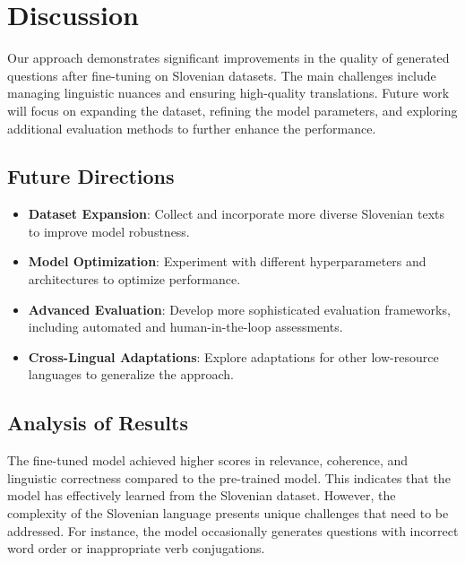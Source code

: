 \documentclass[fleqn,moreauthors,10pt]{ds_report}
\begin{document}



\section*{Discussion}
Our approach demonstrates significant improvements in the quality of generated questions after fine-tuning on Slovenian datasets. The main challenges include managing linguistic nuances and ensuring high-quality translations. Future work will focus on expanding the dataset, refining the model parameters, and exploring additional evaluation methods to further enhance the performance.

\subsection*{Future Directions}
\begin{itemize}[noitemsep]
    \item \textbf{Dataset Expansion}: Collect and incorporate more diverse Slovenian texts to improve model robustness.
    \item \textbf{Model Optimization}: Experiment with different hyperparameters and architectures to optimize performance.
    \item \textbf{Advanced Evaluation}: Develop more sophisticated evaluation frameworks, including automated and human-in-the-loop assessments.
    \item \textbf{Cross-Lingual Adaptations}: Explore adaptations for other low-resource languages to generalize the approach.
\end{itemize}

\subsection*{Analysis of Results}
The fine-tuned model achieved higher scores in relevance, coherence, and linguistic correctness compared to the pre-trained model. This indicates that the model has effectively learned from the Slovenian dataset. However, the complexity of the Slovenian language presents unique challenges that need to be addressed. For instance, the model occasionally generates questions with incorrect word order or inappropriate verb conjugations.
\end{document}
